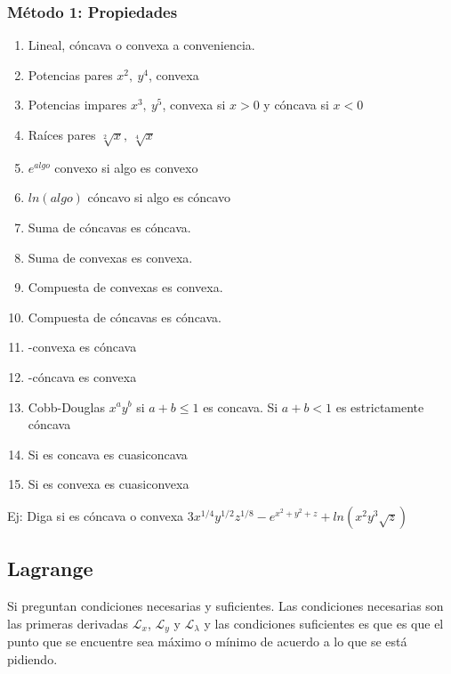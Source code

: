 \subsubsection{Método 1: Propiedades}
\begin{enumerate}
	\item Lineal, cóncava o convexa a conveniencia.
	\item Potencias pares $x^2,\ y^4$, convexa
	\item Potencias impares $x^3,\ y^5$, convexa si $x>0$ y cóncava si $x<0$
	\item Raíces pares $\sqrt[2]{x},\ \sqrt[4]{x}$
	\item $e^{algo}$ convexo si algo es convexo
	\item $ln(algo)$ cóncavo si algo es cóncavo
	\item Suma de cóncavas es cóncava.
	\item Suma de convexas es convexa.
	\item Compuesta de convexas es convexa.
	\item Compuesta de cóncavas es cóncava.
	\item -convexa es cóncava
	\item -cóncava es convexa
	\item Cobb-Douglas $x^ay^b$ si $a+b\leq1$ es concava. Si $a+b<1$ es estrictamente cóncava
	\item Si es concava es cuasiconcava
	\item Si es convexa es cuasiconvexa	
\end{enumerate}

Ej: Diga si es cóncava o convexa $3x^{1/4}y^{1/2}z^{1/8}-e^{x^2+y^2+z}+ln(x^2y^3\sqrt{z})$

\subsection{Lagrange}

Si preguntan condiciones necesarias y suficientes. Las condiciones necesarias son las primeras derivadas $\mathcal{L}_x$, $\mathcal{L}_y$ y $\mathcal{L}_\lambda$ y las condiciones suficientes es que es que el punto que se encuentre sea máximo o mínimo de acuerdo a lo que se está pidiendo.

